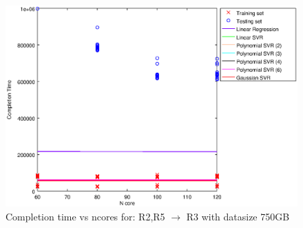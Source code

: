 
\begin {figure}[hbtp]
\centering
\includegraphics[width=\textwidth]{output/R2_R5_VS_R3_750_ALL_FEATURES/plot_R2_R5_VS_R3_750.eps}
\caption{Completion time vs ncores for: R2,R5 $\rightarrow$ R3 with datasize 750GB}
\label{fig:coreonly_linear_R2,R5_R3_750}
\end {figure}
